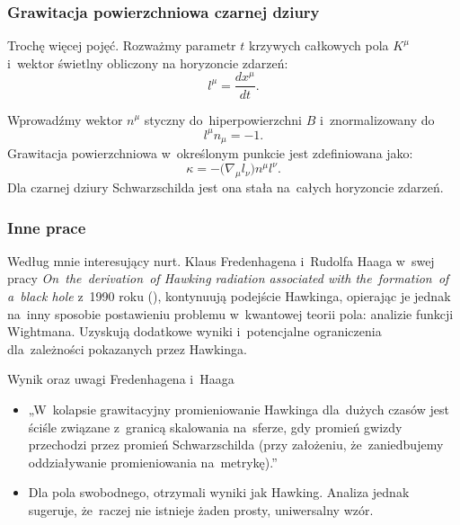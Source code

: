 \documentclass[10pt,t]{beamer}
\begin{document}
\begin{frame}
  \frametitle{Grawitacja powierzchniowa czarnej dziury}


  Trochę więcej pojęć.
  Rozważmy parametr $t$ krzywych całkowych pola $K^{ \mu }$ i~wektor
  świetlny obliczony na horyzoncie zdarzeń:
  \begin{equation}
    \label{eq:HawkingPromieniowanie-50}
    l^{ \mu } =  \frac{ d x^{ \mu } }{ d t }.
  \end{equation}

  Wprowadźmy wektor $n^{ \mu }$ styczny do~hiperpowierzchni $B$
  i~znormalizowany do
  \begin{equation}
    \label{eq:HawkingPromieniowanie-51}
    l^{ \mu } n_{ \mu } = -1.
  \end{equation}
  Grawitacja powierzchniowa w~określonym punkcie jest zdefiniowana
  jako:
  \begin{equation}
    \label{eq:HawkingPromieniowanie-52}
    \kappa = -\big( \nabla_{ \mu } l_{ \nu } \big) n^{ \mu } l^{ \nu }.
  \end{equation}
  Dla czarnej dziury Schwarzschilda jest ona stała na~całych
  horyzoncie zdarzeń.

\end{frame}





\begin{frame}
  \frametitle{Inne prace}


  Według mnie interesujący nurt. Klaus Fredenhagena i~Rudolfa Haaga w~swej
  pracy \textit{On~the~derivation~of Hawking radiation associated with
    the~formation~of a~black hole} z~1990 roku
  (\cite{FredenhagenHaagDerivationOfHawkingRadiation1990}),
  kontynuują podejście Hawkinga, opierając je jednak na~inny
  sposobie postawieniu problemu w~kwantowej teorii pola: analizie
  funkcji Wightmana. Uzyskują dodatkowe wyniki i~potencjalne
  ograniczenia dla~zależności pokazanych przez Hawkinga.

  Wynik oraz uwagi Fredenhagena i~Haaga
  \begin{itemize}

  \item „W~kolapsie grawitacyjny promieniowanie Hawkinga dla~dużych
    czasów jest ściśle związane z~granicą skalowania na~sferze, gdy
    promień gwizdy przechodzi przez promień Schwarzschilda (przy
    założeniu, że~zaniedbujemy oddziaływanie promieniowania
    na~metrykę).”

  \item Dla pola swobodnego, otrzymali wyniki jak Hawking. Analiza
    jednak sugeruje, że~raczej nie istnieje żaden prosty,
    uniwersalny wzór.

  \end{itemize}

\end{frame}
\end{document}
